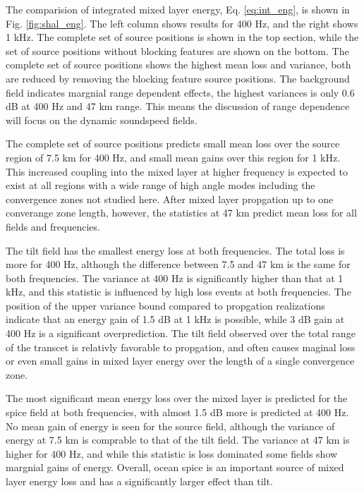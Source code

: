 \documentclass[preprint,NumberedRefs]{JASA}
\begin{document}
The comparision of integrated mixed layer energy, Eq. \eqref{eq:int_eng}, is shown in Fig. \ref{fig:shal_eng}. The left column shows results for 400 Hz, and the right shows 1 kHz. The complete set of source positions is shown in the top section, while the set of source positions without blocking features are shown on the bottom. The complete set of source positions shows the highest mean loss and variance, both are reduced by removing the blocking feature source positions. The background field indicates margnial range dependent effects, the highest variances is only 0.6 dB at 400 Hz and 47 km range. This means the discussion of range dependence will focus on the dynamic soundspeed fields.

The complete set of source positions predicts small mean loss over the source region of 7.5 km for 400 Hz, and small mean gains over this region for 1 kHz. This increased coupling into the mixed layer at higher frequency is expected to exist at all regions with a wide range of high angle modes including the convergence zones not studied here. After mixed layer propgation up to one converange zone length, however, the statistics at 47 km predict mean loss for all fields and frequencies.

The tilt field has the smallest energy loss at both frequencies. The total loss is more for 400 Hz, although the difference between 7.5 and 47 km is the same for both frequencies. The variance at 400 Hz is significantly higher than that at 1 kHz, and this statistic is influenced by high loss events at both frequencies. The position of the upper variance bound compared to propgation realizations indicate that an energy gain of 1.5 dB at 1 kHz is possible, while 3 dB gain at 400 Hz is a significant overprediction. The tilt field observed over the total range of the transcet is relativly favorable to propgation, and often causes maginal loss or even small gains in mixed layer energy over the length of a single convergence zone.

The most significant mean energy loss over the mixed layer is predicted for the spice field at both frequencies, with almost 1.5 dB more is predicted at 400 Hz. No mean gain of energy is seen for the source field, although the variance of energy at 7.5 km is comprable to that of the tilt field. The variance at 47 km is higher for 400 Hz, and while this statistic is loss dominated some fields show margnial gains of energy. Overall, ocean spice is an important source of mixed layer energy loss and has a significantly larger effect than tilt.
\end{document}
